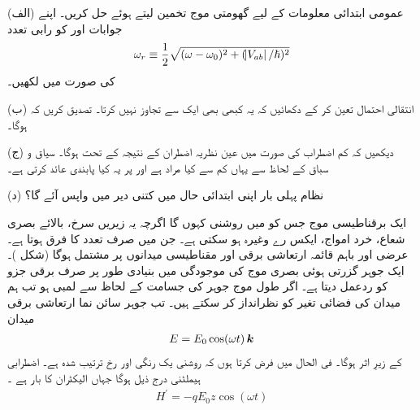 (الف) عمومی ابتدائی معلومات  کے لیے گھومتی موج تخمین  لیتے ہوئے  حل کریں۔ اپنے جوابات  اور  کو رابی تعدد 
\begin{align}
	\omega_r\equiv\frac{1}{2}\sqrt{(\omega-\omega_0)^2+(\abs{V_{ab}}/\hslash)^2}
\end{align}
کی صورت میں لکھیں۔

(ب) انتقالی احتمال  تعین کر کے دکھائیں کہ یہ کبھی بھی ایک سے تجاوز نہیں کرتا۔ تصدیق کریں کہ  ہوگا۔

(ج) دیکھیں کہ کم اضطراب کی صورت میں  عین نظریہ اضطران کے نتیجہ  کے تحت ہوگا۔ سیاق و سباق کے لحاظ سے یہاں کم سے کیا مراد ہے اور  پر یہ کیا پابندی عائد  کرتی ہے۔

(د) نظام پہلی بار اپنی ابتدائی حال میں کتنی دیر میں واپس آئے گا؟


ایک برقناطیسی موج جس کو میں روشنی کہوں گا اگرچہ یہ زیریں سرخ، بالائے بصری شعاع، خرد امواج، ایکس رے وغیرہ ہو سکتی ہے۔ جن میں صرف تعدد کا فرق ہوتا ہے۔ عرضی اور باہم قائمہ ارتعاشی برقی اور مقناطیسی میدانوں پر مشتمل ہوگا (شکل )۔ ایک جوہر گزرتی ہوئی بصری موج کی موجودگی میں بنیادی طور پر صرف برقی جزو کو ردعمل دیتا ہے۔ اگر طول موج جوہر کی جسامت کے لحاظ سے لمبی ہو تب ہم میدان کی فضائی تغیر کو نظرانداز کر سکتے ہیں۔ تب جوہر سائن نما ارتعاشی برقی میدان
\begin{align}
	E = E_0\cos(\omega t)\,{\boldsymbol{k}}
\end{align}
کے زیرِ اثر ہوگا۔ فی الحال میں فرض کرتا ہوں کہ روشنی یک رنگی اور  رخ ترتیب شدہ ہے۔ اضطرابی ہیملٹنی درج ذیل ہوگا جہاں  الیکٹران کا بار ہے ۔
\begin{align}
	H^\prime =-qE_0z\cos(\omega t)
\end{align}	

